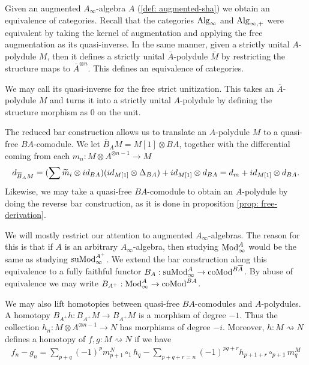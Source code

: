 \documentclass[../thesis.tex]{subfiles}
\begin{document}
            Given an augmented $A_\infty$-algebra $A$ (\ref{def: augmented-sha}) we obtain an equivalence of categories. Recall that the categories $\tt{Alg}_\infty$ and $\tt{Alg}_{\infty,+}$ were equivalent by taking the kernel of augmentation and applying the free augmentation as its quasi-inverse. In the same manner, given a strictly unital $A$-polydule $M$, then it defines a strictly unital $\bar{A}$-polydule $\bar{M}$ by restricting the structure maps to $\bar{A}^{\otimes n}$. This defines an equivalence of categories.
            \begin{center}
            \end{center}
            We may call its quasi-inverse for the free strict unitization. This takes an $\overline{A}$-polydule $M$ and turns it into a strictly unital $A$-polydule by defining the structure morphism as $0$ on the unit.

            The reduced bar construction allows us to translate an $A$-polydule $M$ to a quasi-free $BA$-comodule. We let $\overline{B}_AM = M[1] \otimes BA$, together with the differential coming from each $m_n : M \otimes A^{\otimes n - 1} \rightarrow M$
            \begin{align*}
                d_{\overline{B}_AM} = (\sum \widetilde{m}_i \otimes id_{BA})(id_{M[1]}\otimes \Delta_{BA}) + id_{M[1]}\otimes d_{BA} = d_m + id_{M[1]}\otimes d_{BA}\tt{.}
            \end{align*}
            Likewise, we may take a quasi-free $BA$-comodule to obtain an $A$-polydule by doing the reverse bar construction, as it is done in proposition \ref{prop: free-derivation}.

            We will mostly restrict our attention to augmented $A_\infty$-algebras. The reason for this is that if $A$ is an arbitrary $A_\infty$-algebra, then studying $\tt{Mod}_\infty^A$ would be the same as studying $\tt{suMod}_\infty^{A^+}$. We extend the bar construction along this equivalence to a fully faithful functor $B_A : \tt{suMod}_\infty^A \rightarrow \tt{coMod}^{B\overline{A}}$. By abuse of equivalence we may write $B_{A^+} : \tt{Mod}_\infty^A \rightarrow \tt{coMod}^{BA}$.

            We may also lift homotopies between quasi-free $BA$-comodules and $A$-polydules. A homotopy $B_{A^+}h : B_{A^+}M \rightarrow B_{A^+}M$ is a morphism of degree $-1$. Thus the collection $h_n : M \otimes A^{\otimes n-1} \rightarrow N$ has morphisms of degree $-i$. Moreover, $h : M \rightsquigarrow N$ defines a homotopy of $f, g : M \rightsquigarrow N$ if we have
            \begin{align*}
                f_n - g_n = \sum_{p+q}(-1)^{p}m^N_{p+1}\circ_1 h_q - \sum_{p+q+r = n}(-1)^{pq+r}h_{p+1+r}\circ_{p+1} m^M_q
            \end{align*}
\end{document}
